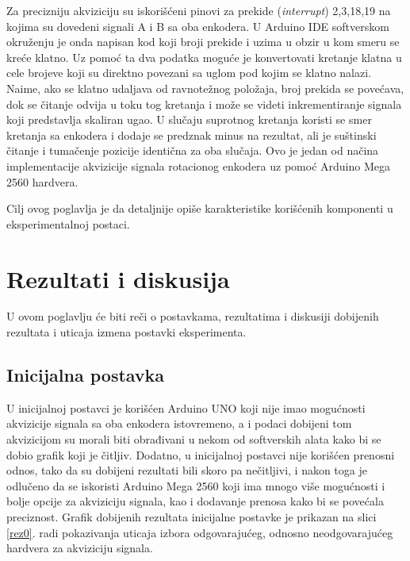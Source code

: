 \documentclass[a4paper, 12pt, diplomski]{etf}
\begin{document}
\noindent
Za precizniju akviziciju su iskorišćeni pinovi za prekide (\textit{interrupt}) 2,3,18,19 na kojima su dovedeni signali A i B sa oba enkodera. U Arduino IDE softverskom okruženju je onda napisan kod koji broji prekide i uzima u obzir u kom smeru se kreće klatno. Uz pomoć ta dva podatka moguće je konvertovati kretanje klatna u cele brojeve koji su direktno povezani sa uglom pod kojim se klatno nalazi. Naime, ako se klatno udaljava od ravnotežnog položaja, broj prekida se povećava, dok se čitanje odvija u toku tog kretanja i može se videti inkrementiranje signala koji predstavlja skaliran ugao. U slučaju suprotnog kretanja koristi se smer kretanja sa enkodera i dodaje se predznak minus na rezultat, ali je suštinski čitanje i tumačenje pozicije identična za oba slučaja. Ovo je jedan od načina implementacije akvizicije signala rotacionog enkodera uz pomoć Arduino Mega 2560 hardvera.
\cite{arduino}\cite{oe}\cite{coolTerm}

Cilj ovog poglavlja je da detaljnije opiše karakteristike korišćenih komponenti u eksperimentalnoj postaci.

\newpage

\section{Rezultati i diskusija}
\label{s:Rezultati}

U ovom poglavlju će biti reči o postavkama, rezultatima i diskusiji dobijenih rezultata i uticaja izmena postavki eksperimenta. 

\subsection{Inicijalna postavka}

U inicijalnoj postavci je korišćen Arduino UNO koji nije imao mogućnosti akvizicije signala sa oba enkodera istovremeno, a i podaci dobijeni tom akvizicijom su morali biti obrađivani u nekom od softverskih alata kako bi se dobio grafik koji je čitljiv. Dodatno, u inicijalnoj postavci nije korišćen prenosni odnos, tako da su dobijeni rezultati bili skoro pa nečitljivi, i nakon toga je odlučeno da se iskoristi Arduino Mega 2560 koji ima mnogo više mogućnosti i bolje opcije za akviziciju signala, kao i dodavanje prenosa kako bi se povećala preciznost. Grafik dobijenih rezultata inicijalne postavke je prikazan na slici \ref{rez0}. radi pokazivanja uticaja izbora odgovarajućeg, odnosno neodgovarajućeg hardvera za akviziciju signala.
\end{document}
